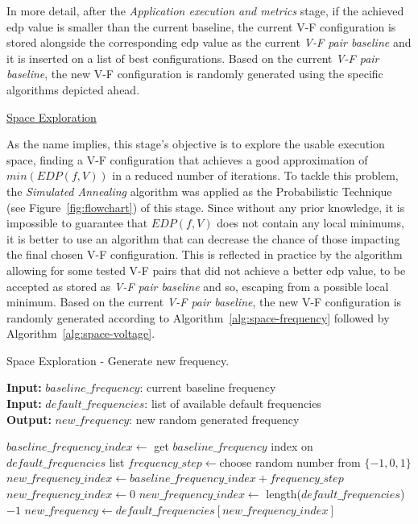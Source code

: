 In more detail, after the \textit{Application execution and metrics} stage, if the achieved \acrshort{edp} value is smaller than the current baseline, the current V-F configuration is stored alongside the corresponding \acrshort{edp} value as the current \textit{V-F pair baseline} and it is inserted on a list of best configurations. Based on the current \textit{V-F pair baseline}, the new V-F configuration is randomly generated using the specific algorithms depicted ahead.


\bigskip
\underline{Space Exploration}
\bigskip

As the name implies, this stage's objective is to explore the usable execution space, finding a V-F configuration that achieves a good approximation of $min(EDP(f, V))$ in a reduced number of iterations.
To tackle this problem, the \textit{Simulated Annealing} algorithm was applied as the Probabilistic Technique (see Figure~\ref{fig:flowchart}) of this stage. Since without any prior knowledge, it is impossible to guarantee that $EDP(f, V)$ does not contain any local minimums, it is better to use an algorithm that can decrease the chance of those impacting the final chosen V-F configuration. This is reflected in practice by the algorithm allowing for some tested V-F pairs that did not achieve a better \acrshort{edp} value, to be accepted as stored as \textit{V-F pair baseline} and so, escaping from a possible local minimum. Based on the current \textit{V-F pair baseline}, the new V-F configuration is randomly generated according to Algorithm~\ref{alg:space-frequency} followed by Algorithm~\ref{alg:space-voltage}.

\begin{algorithm}
    \caption{Space Exploration - Generate new frequency.}
    \label{alg:space-frequency}
 \hspace*{\algorithmicindent} \textbf{Input:} $baseline\_frequency$: current baseline frequency \\
 \hspace*{\algorithmicindent} \textbf{Input:} $default\_frequencies$: list of available default frequencies \\
 \hspace*{\algorithmicindent} \textbf{Output:} $new\_frequency$: new random generated frequency
\begin{algorithmic}
\STATE $baseline\_frequency\_index \leftarrow$ get $baseline\_frequency$ index on $default\_frequencies$ list
\STATE $frequency\_step \leftarrow $choose random number from $\{-1, 0, 1\}$
\STATE $new\_frequency\_index \leftarrow baseline\_frequency\_index + frequency\_step$
\STATE $new\_frequency\_index \leftarrow 0$
\STATE $new\_frequency\_index \leftarrow$ length($default\_frequencies$) $-1$
\ENDIF
\STATE $new\_frequency \leftarrow default\_frequencies[new\_frequency\_index]$
\end{algorithmic}
\end{algorithm}

